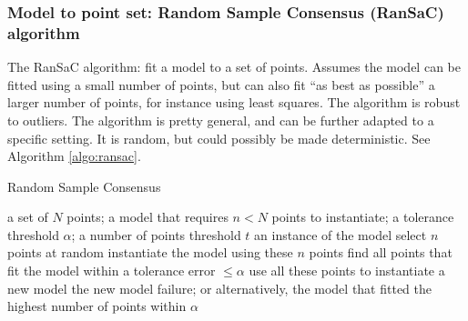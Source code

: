 \documentclass[11pt]{article} %
\begin{document}

    \subsubsection{ Model to point set: Random Sample Consensus (RanSaC) algorithm \linebreak[4] \cite{fischler:ransac}}
The RanSaC algorithm: fit a model to a set of points. Assumes the model can be fitted using a small number of points, but can also fit ``as best as possible'' a larger number of points, for instance using least squares. The algorithm is robust to outliers. The algorithm is pretty general, and can be further adapted to a specific setting. It is random, but could possibly be made deterministic. See Algorithm \ref{algo:ransac}.

\begin{algorithm}[h!]
\caption{Random Sample Consensus}
\label{algo:ransac}
\begin{algorithmic}
  \REQUIRE a set of $N$ points; a model that requires $n < N$ points to instantiate; a tolerance threshold $\alpha$; a number of points threshold $t$
  \ENSURE an instance of the model
  \LOOP
    \STATE select $n$ points at random
    \STATE instantiate the model using these $n$ points
    \STATE find all points that fit the model within a tolerance error $\leq \alpha$
      \STATE use all these points to instantiate a new model
      \RETURN the new model
    \ENDIF
  \ENDLOOP%
  \RETURN failure; or alternatively, the model that fitted the highest number of points within $\alpha$
  \ENDIF
\end{algorithmic}
\end{algorithm}
\end{document}
